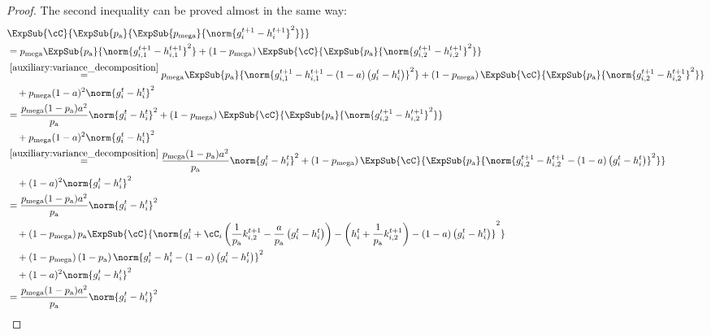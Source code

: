 \documentclass{article}
\newcommand*{\probavailable}{\ensuremath{p_{\textnormal{a}}}}
\newcommand*{\probmega}{\ensuremath{p_{\text{mega}}}}
\begin{document}
\begin{proof}
  The second inequality can be proved almost in the same way:
  \begin{align*}
    &\ExpSub{\cC}{\ExpSub{\probavailable}{\ExpSub{\probmega}{\norm{g^{t+1}_i - h^{t+1}_i}^2}}} \\
    &= \probmega \ExpSub{\probavailable}{\norm{g^{t+1}_{i,1} - h^{t+1}_{i,1}}^2} + \left(1 - \probmega\right) \ExpSub{\cC}{\ExpSub{\probavailable}{\norm{g^{t+1}_{i,2} - h^{t+1}_{i,2}}^2}} \\
    &\overset{\eqref{auxiliary:variance_decomposition}}{=} \probmega \ExpSub{\probavailable}{\norm{g^{t+1}_{i,1} - h^{t+1}_{i,1} - (1 - a)\left(g^{t}_{i} - h^{t}_{i}\right)}^2} + \left(1 - \probmega\right) \ExpSub{\cC}{\ExpSub{\probavailable}{\norm{g^{t+1}_{i,2} - h^{t+1}_{i,2}}^2}} \\
    &\quad + \probmega (1 - a)^2 \norm{g^{t}_{i} - h^{t}_{i}}^2 \\
    &= \frac{\probmega(1 - \probavailable) a^2}{\probavailable}\norm{g^{t}_{i} - h^{t}_{i}}^2 + \left(1 - \probmega\right) \ExpSub{\cC}{\ExpSub{\probavailable}{\norm{g^{t+1}_{i,2} - h^{t+1}_{i,2}}^2}}\\
    &\quad + \probmega (1 - a)^2 \norm{g^{t}_{i} - h^{t}_{i}}^2 \\
    &\overset{\eqref{auxiliary:variance_decomposition}}{=} \frac{\probmega(1 - \probavailable) a^2}{\probavailable}  \norm{g^{t}_{i} - h^{t}_{i}}^2 + \left(1 - \probmega\right) \ExpSub{\cC}{\ExpSub{\probavailable}{\norm{g^{t+1}_{i,2} - h^{t+1}_{i,2} - (1 - a)\left(g^{t}_{i} - h^{t}_{i}\right)}^2}}\\
    &\quad + (1 - a)^2 \norm{g^{t}_{i} - h^{t}_{i}}^2 \\
    &= \frac{\probmega(1 - \probavailable) a^2}{\probavailable}  \norm{g^{t}_{i} - h^{t}_{i}}^2 \\
    &\quad + \left(1 - \probmega\right) \probavailable \ExpSub{\cC}{\norm{g^t_i + \cC_i\left(\frac{1}{\probavailable}k^{t+1}_{i, 2} - \frac{a}{\probavailable} \left(g^t_i - h^{t}_i\right)\right) - \left(h^t_i + \frac{1}{\probavailable} k^{t+1}_{i, 2}\right) - (1 - a)\left(g^{t}_{i} - h^{t}_{i}\right)}^2} \\
    &\quad + \left(1 - \probmega\right) \left(1 - \probavailable\right)\norm{g^{t}_{i} - h^{t}_{i} - (1 - a)\left(g^{t}_{i} - h^{t}_{i}\right)}^2\\
    &\quad + (1 - a)^2 \norm{g^{t}_{i} - h^{t}_{i}}^2 \\
    &= \frac{\probmega(1 - \probavailable) a^2}{\probavailable}  \norm{g^{t}_{i} - h^{t}_{i}}^2 \\

\end{align*}
\end{proof}
\end{document}

